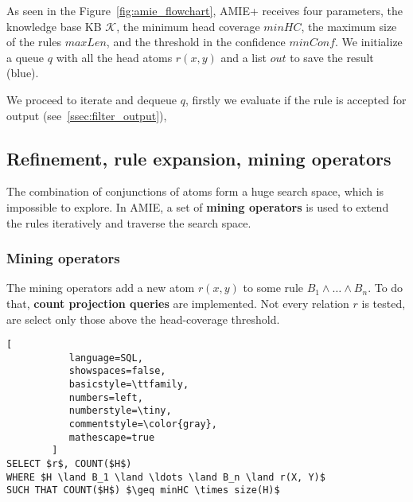 \documentclass{article}
\begin{document}
As seen in the Figure~\ref{fig:amie_flowchart}, AMIE+ receives four parameters,
the knowledge base KB $\mathcal{K}$, the minimum head coverage $minHC$, the
maximum size of the rules $maxLen$, and the threshold in the confidence
$minConf$. We initialize a queue $q$ with all the head atoms $r(x,y)$ and a
list $out$ to save the result (blue).

We proceed to iterate and dequeue $q$, firstly we evaluate if the rule is accepted for
output (see~\ref{ssec:filter_output}),


\subsection{Refinement, rule expansion, mining operators}


The combination of conjunctions of atoms form a huge search space, which is
impossible to explore. In AMIE, a set of \textbf{mining operators} is used to
extend the rules iteratively and traverse the search space. 

\subsubsection{Mining operators}

The mining operators add a new atom $r(x, y)$ to some rule $B_1 \land \ldots
\land B_n$. To do that, \textbf{count projection queries} are implemented. Not
every relation $r$ is tested, are select only those above the head-coverage threshold.


\begin{lstlisting}[
           language=SQL,
           showspaces=false,
           basicstyle=\ttfamily,
           numbers=left,
           numberstyle=\tiny,
           commentstyle=\color{gray},
           mathescape=true
        ]
SELECT $r$, COUNT($H$) 
WHERE $H \land B_1 \land \ldots \land B_n \land r(X, Y)$
SUCH THAT COUNT($H$) $\geq minHC \times size(H)$
\end{lstlisting}
\end{document}
